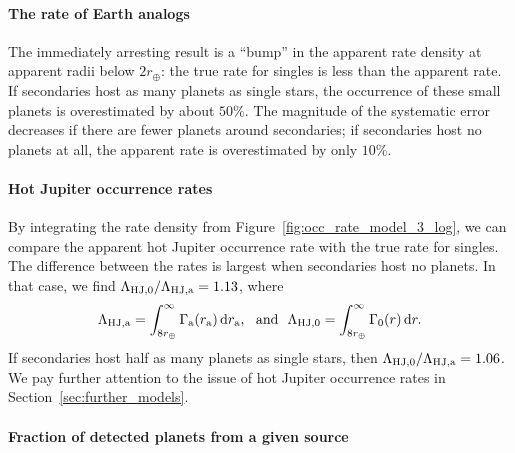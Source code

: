 \documentclass[12pt,modern]{aastex61}
\renewcommand{\a}{_{\rm a}}
\begin{document}
\paragraph{The rate of Earth analogs} The immediately arresting result
is a ``bump'' in the apparent rate density at apparent radii below
$2r_\oplus$: the true rate for singles is less than the apparent rate.
If secondaries host as many planets as single stars, the occurrence of
these small planets is overestimated by about $50\%$.  The magnitude
of the systematic error decreases if there are fewer planets around
secondaries; if secondaries host no planets at all, the apparent rate
is overestimated by only $10\%$.  

\paragraph{Hot Jupiter occurrence rates}
By integrating the rate density from
Figure~\ref{fig:occ_rate_model_3_log}, we can compare the apparent hot
Jupiter occurrence rate with the true rate for singles.  The
difference between the rates is largest when secondaries host no
planets. In that case, we find $\Lambda_{{\rm HJ},0}/\Lambda_{\rm
HJ,a} = 1.13$, where
\begin{equation}
    \Lambda_{\rm HJ,a} =
      \int_{8r_\oplus}^{\infty} \Gamma\a(r\a)\,{\rm d}r\a,~~{\rm
      and}~~
    \Lambda_{\rm HJ,0} =
      \int_{8r_\oplus}^{\infty} \Gamma_0(r)\,{\rm d}r.
\end{equation}
If secondaries host half as many planets as single stars, then
$\Lambda_{{\rm HJ},0}/\Lambda_{\rm HJ,a} = 1.06$.  We pay further
attention to the issue of hot Jupiter occurrence rates in
Section~\ref{sec:further_models}.

\paragraph{Fraction of detected planets from a given source}
\end{document}
